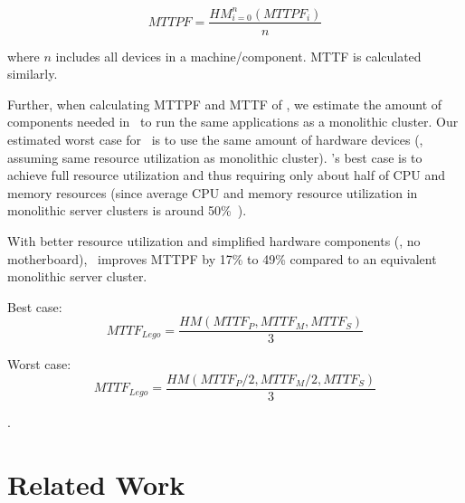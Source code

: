 \documentclass[10pt,times,twocolumn]{z2-article}
\begin{document}
{{{{{{{\begin{equation}
MTTPF = \frac{HM_{i=0}^n(MTTPF_i)}{n}
\end{equation}

where $n$ includes all devices in a machine/component. MTTF is calculated similarly.

Further, when calculating MTTPF and MTTF of \lego, we estimate the amount of components needed in \lego\ 
to run the same applications as a monolithic cluster.
Our estimated worst case for \lego\ is to use the same amount of hardware devices 
(\ie, assuming same resource utilization as monolithic cluster).
\lego's best case is to achieve full resource utilization 
and thus requiring only about half of CPU and memory resources 
(since average CPU and memory resource utilization in monolithic server clusters is around 50\%~\cite{GoogleTrace,AliTrace}).

With better resource utilization and simplified hardware components (\eg, no motherboard),
\lego\ improves MTTPF by 17\% to 49\% compared to an equivalent monolithic server cluster.

Best case:
\begin{equation}
MTTF_{Lego} = \frac{HM(MTTF_P, MTTF_M, MTTF_S)}{3}
\end{equation}

Worst case:
\begin{equation}
MTTF_{Lego} = \frac{HM(MTTF_P/2, MTTF_M/2, MTTF_S)}{3}
\end{equation}
\fi

.
\section{Related Work}
\label{sec:related}

}}}}}}}
\end{document}
